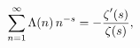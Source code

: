 \[\sum_{n=1}^{\infty}\mathop{\Lambda\/}\nolimits\!\left(n\right)n^{-s}=-\frac{%
\mathop{\zeta\/}\nolimits'\!\left(s\right)}{\mathop{\zeta\/}\nolimits\!\left(s%
\right)},\]
